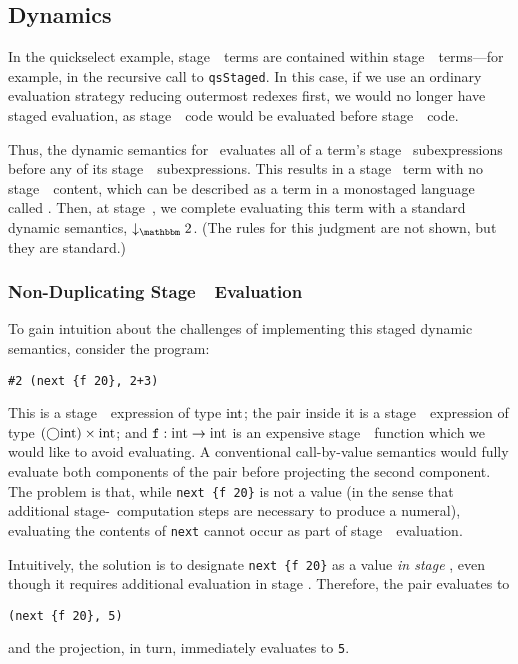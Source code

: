 \subsection{Dynamics}
\label{sec:stagedsemantics}

In the quickselect example, stage~\bbone\ terms are contained within
stage~\bbtwo\ terms---for example, in the recursive call to {\tt qsStaged}. In
this case, if we use an ordinary evaluation strategy reducing outermost redexes
first, we would no longer have staged evaluation, as stage~\bbtwo\ code would
be evaluated before stage~\bbone\ code. 

Thus, the dynamic semantics for \lang\ evaluates all of a term's stage \bbone\
subexpressions before any of its stage~\bbtwo\ subexpressions. This results in
a stage \bbtwo\ term with no stage~\bbone\ content, 
which can be described as a term in a monostaged language called \langTwo. 
Then, at stage~\bbtwo, we complete
evaluating this term with a standard dynamic semantics, $\tworedsym$. (The
rules for this judgment are not shown, but they are standard.)

\subsubsection{Non-Duplicating Stage~\bbone\ Evaluation}

To gain intuition about the challenges of implementing this staged dynamic
semantics, consider the program:
\begin{lstlisting}
#2 (next {f 20}, 2+3)
\end{lstlisting}
This is a stage~\bbone\ expression of type ${\rm int}$; the pair inside it is a
stage~\bbone\ expression of type $(\bigcirc{\rm int})\times{\rm int}$; and ${\tt f} :
{\rm int} \to {\rm int}$ is an expensive stage~\bbtwo\ function which we would like
to avoid evaluating. A conventional call-by-value semantics would fully
evaluate both components of the pair before projecting the second component.
The problem is that, while \verb|next {f 20}| is not a value (in the sense that
additional stage-\bbtwo\ computation steps are necessary to produce a numeral),
evaluating the contents of \verb|next| cannot occur as part of stage~\bbone\
evaluation.

Intuitively, the solution is to designate \verb|next {f 20}| as a value
\emph{in stage \bbone}, even though it requires additional evaluation in stage
\bbtwo. Therefore, the pair evaluates to
\begin{lstlisting}
(next {f 20}, 5)
\end{lstlisting}
and the projection, in turn, immediately evaluates to \verb|5|.

